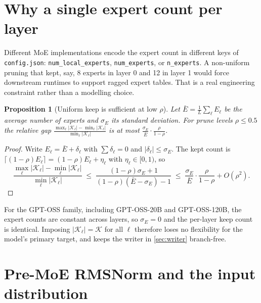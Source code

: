 \documentclass[11pt,a4paper]{article}
\newcommand{\1}{\mathbf{1}}
\newcommand{\Keep}{\mathcal{K}}
\theoremstyle{plain}
\newtheorem{proposition}{Proposition}
\begin{document}
\section{Why a single expert count per layer}

Different MoE implementations encode the expert count in different
keys of \texttt{config.json}: \texttt{num\_local\_experts},
\texttt{num\_experts}, or \texttt{n\_experts}.  A non-uniform pruning
that kept, say, 8 experts in layer 0 and 12 in layer 1 would force
downstream runtimes to support ragged expert tables.  That is a real
engineering constraint rather than a modelling choice.

\begin{proposition}[Uniform keep is sufficient at low $\rho$]
Let $\bar E = \frac{1}{L}\sum_\ell E_\ell$ be the average number of
experts and $\sigma_E$ its standard deviation.  For prune levels
$\rho \le 0.5$ the relative gap
$\frac{\max_\ell |\Keep_\ell| - \min_\ell |\Keep_\ell|}
      {\min_\ell |\Keep_\ell|}$
is at most
$\frac{\sigma_E}{\bar E}\cdot\frac{\rho}{1-\rho}$.
\label{prop:gap}
\end{proposition}

\begin{proof}
Write $E_\ell = \bar E + \delta_\ell$ with $\sum \delta_\ell = 0$ and
$|\delta_\ell| \le \sigma_E$.  The kept count is
$\lceil (1-\rho)E_\ell\rceil = (1-\rho)E_\ell + \eta_\ell$ with
$\eta_\ell \in [0,1)$, so
\[
  \frac{\max_\ell |\Keep_\ell| - \min_\ell |\Keep_\ell|}
       {\min_\ell |\Keep_\ell|}
  \;\le\;
  \frac{(1-\rho)\sigma_E + 1}{(1-\rho)(\bar E - \sigma_E) - 1}
  \;\le\;
  \frac{\sigma_E}{\bar E}\cdot\frac{\rho}{1-\rho} + O(\rho^2).
\]
\end{proof}

For the GPT-OSS family, including GPT-OSS-20B and GPT-OSS-120B, the
expert counts are constant across layers, so
$\sigma_E = 0$ and the per-layer keep count is identical.  Imposing
$|\Keep_\ell| = \Keep$ for all $\ell$ therefore loses no flexibility
for the model's primary target, and keeps the writer in
\autoref{sec:writer} branch-free.

\section{Pre-MoE RMSNorm and the input distribution}
\end{document}

